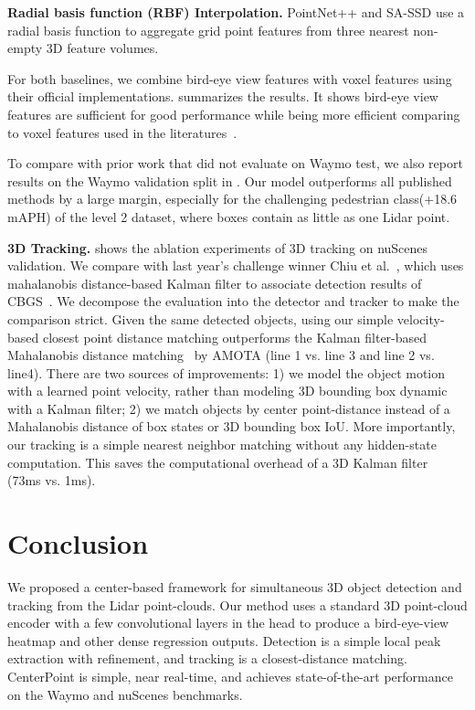 \documentclass[final]{cvpr}
\begin{document}
\textbf{Radial basis function (RBF) Interpolation.}
PointNet++\cite{qi2017pointnet++} and SA-SSD\cite{sassd} use a radial basis function to aggregate grid point features from three nearest non-empty 3D feature volumes. 

For both baselines, we combine bird-eye view features with voxel features using their official implementations.  
 summarizes the results. 
It shows bird-eye view features are sufficient for good performance while being more efficient comparing to voxel features used in the literatures~\cite{pvrcnn,sassd,qi2017pointnet++}.

To compare with prior work that did not evaluate on Waymo test, we also report results on the Waymo validation split in .
Our model outperforms all published methods by a large margin, especially for the challenging pedestrian class(+18.6 mAPH) of the level 2 dataset, where boxes contain as little as one Lidar point.   

\noindent 
\textbf{3D Tracking.} 
 shows the ablation experiments of 3D tracking on nuScenes validation.  
We compare with last year's challenge winner Chiu et al.~\cite{chiu2020probabilistic}, which uses mahalanobis distance-based Kalman filter to associate detection results of CBGS~\cite{zhu2019classbalanced}.  
We decompose the evaluation into the detector and tracker to make the comparison strict. 
Given the same detected objects, using our simple velocity-based closest point distance matching outperforms the Kalman filter-based Mahalanobis distance matching~\cite{chiu2020probabilistic} by  AMOTA (line 1 vs. line 3 and line 2 vs. line4). 
There are two sources of improvements: 1) we model the object motion with a learned point velocity, rather than modeling 3D bounding box dynamic with a Kalman filter; 2) we match objects by center point-distance instead of a Mahalanobis distance of box states or 3D bounding box IoU. 
More importantly, our tracking is a simple nearest neighbor matching without any hidden-state computation.
This saves the computational overhead of a 3D Kalman filter~\cite{chiu2020probabilistic} (73ms vs. 1ms).

\section{Conclusion}

We proposed a center-based framework for simultaneous 3D object detection and tracking from the Lidar point-clouds. 
Our method uses a standard 3D point-cloud encoder with a few convolutional layers in the head to produce a bird-eye-view heatmap and other dense regression outputs.
Detection is a simple local peak extraction with refinement, and tracking is a closest-distance matching.
CenterPoint is simple, near real-time, and achieves state-of-the-art performance on the Waymo and nuScenes benchmarks.
\end{document}
